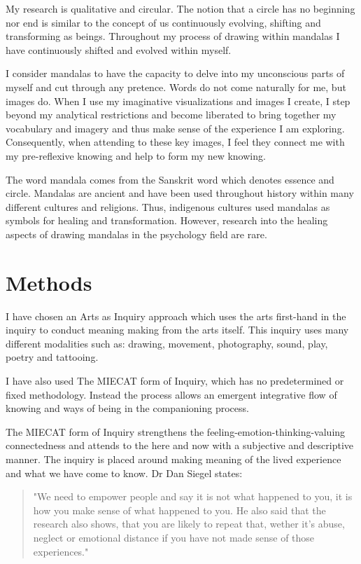 My research is qualitative and circular. The notion that a circle has no beginning nor end is similar to the concept of us continuously evolving, shifting and transforming as beings. Throughout my process of drawing within mandalas I have continuously shifted and evolved within myself. 

I consider mandalas to have the capacity to delve into my unconscious parts of myself and cut through any pretence. Words do not come naturally for me, but images do. When I use my imaginative visualizations and images I create, I step beyond my analytical restrictions and become liberated to bring together my vocabulary and imagery and thus make sense of the experience I am exploring. Consequently, when attending to these key images, I feel they connect me with my pre-reflexive knowing and help to form my new knowing. 

The word mandala comes from the Sanskrit word which denotes essence and circle. Mandalas are ancient and have been used throughout history within many different cultures and religions. Thus, indigenous cultures used mandalas as symbols for healing and transformation. However, research into the healing aspects of drawing mandalas in the psychology field are rare. 

\section{Methods}


I have chosen an Arts as Inquiry approach which uses the arts first-hand in the inquiry to conduct meaning making from the arts itself. This inquiry uses many different modalities such as: drawing, movement, photography, sound, play, poetry and tattooing.

I have also used The MIECAT form of Inquiry, which has no predetermined or fixed methodology. Instead the process allows an emergent integrative flow of knowing and ways of being in the companioning process.  

The MIECAT form of Inquiry strengthens the feeling-emotion-thinking-valuing connectedness and attends to the here and now with a subjective and descriptive manner. The inquiry is placed around making meaning of the lived experience and what we have come to know. Dr Dan Siegel states: 

\begin{quotation}
"We need to empower people and say it is not what happened to you, it is how you make sense of what happened to you. He also said that the research also shows, that you are likely to repeat that, wether it's abuse, neglect or emotional distance if you have not made sense of those experiences." 
\end{quotation}

